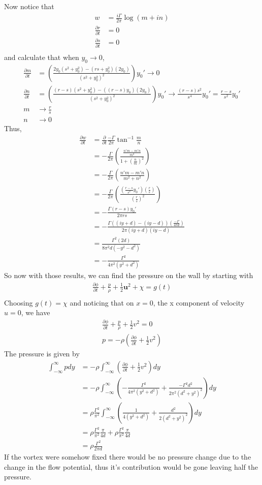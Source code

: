 \documentclass[12pt]{article}
\newcommand{\eq}[1]{\begin{align*}#1\end{align*}}
\newcommand{\p}[2]{\frac{\partial#1}{\partial#2}}
\begin{document}
Now notice that
\eq{
	w &= \frac{i\Gamma}{2\pi}\log(m + in)\\
	\p{r}{t} &= 0\\
	\p{s}{t} &= 0\\
}
and calculate that when $y_0 \rightarrow 0$,
\eq{
	\p{m}{t} &= \left(\frac{2y_0(s^2 + y_0^2) - (rs + y_0^2)(2y_0)}{(s^2 + y_0^2)^2}\right)y_0' \rightarrow 0\\
	\p{n}{t} &= \left( \frac{(r-s)(s^2 + y_0^2) - ((r-s)y_0)(2y_0)}{(s^2 + y_0^2)^2} \right)y_0' \rightarrow \frac{(r-s)s^2}{s^4}y_0' = \frac{r-s}{s^2}y_0'\\
	m &\rightarrow \frac{r}{s}\\
	n &\rightarrow 0
}
Thus,
\eq{
	\p{w}{t} &= \p{}{t}\frac{-\Gamma}{2\pi}\tan^{-1}\frac{m}{n}\\
	&= -\frac{\Gamma}{2\pi}\left( \frac{\frac{n'm - m'n}{m^2}}{1 + (\frac{n}{m})^2}\right)\\
	&= -\frac{\Gamma}{2\pi}\left( \frac{n'm - m'n}{m^2 + n^2}\right)\\
	&= -\frac{\Gamma}{2\pi}\left( \frac{\left(\frac{r-s}{s^2}y_0'\right)(\frac{r}{s})}{(\frac{r}{s})^2}\right)\\
	&= -\frac{\Gamma(r-s)y_0'}{2\pi rs}\\
	&= -\frac{\Gamma((iy + d) - (iy - d)) \left(\frac{-\Gamma}{4\pi d}\right) }{2\pi (iy + d)(iy - d)}\\
	&= \frac{\Gamma^2(2d)}{8\pi^2 d(-y^2 - d^2)}\\
	&= -\frac{\Gamma^2}{4\pi^2(y^2 + d^2)}
}
So now with those results, we can find the pressure on the wall by starting with
\eq{
	\p{\phi}{t} + \frac{p}{\rho} + \frac{1}{2}\bm{u}^2 + \chi = g(t)\\
}
Choosing $g(t) = \chi$ and noticing that on $x = 0$, the x component of velocity $u = 0$, we have
\eq{
	\p{\phi}{t} + \frac{p}{\rho} + \frac{1}{2}v^2 = 0\\
	p = -\rho\left(\p{\phi}{t} + \frac{1}{2}v^2\right)
}
The pressure is given by
\eq{
	\int_{-\infty}^\infty p dy &= -\rho\int_{-\infty}^\infty\left(\p{\phi}{t} + \frac{1}{2}v^2\right)dy\\
	&= -\rho\int_{-\infty}^\infty\left(-\frac{\Gamma^2}{4\pi^2(y^2 + d^2)} + \frac{-\Gamma^2 d^2}{2\pi^2(d^2 + y^2)^2}\right)dy\\
	&= \rho\frac{\Gamma^2}{\pi^2}\int_{-\infty}^\infty\left(\frac{1}{4(y^2 + d^2)} + \frac{d^2}{2(d^2 + y^2)^2}\right)dy\\
	&= \rho\frac{\Gamma^2}{\pi^2}\frac{\pi}{4d} + \rho\frac{\Gamma^2}{\pi^2}\frac{\pi}{4d}\\
	&= \rho\frac{\Gamma^2}{2\pi d}
}
If the vortex were somehow fixed there would be no pressure change due to the change in the flow potential, thus it's contribution would be gone leaving half the pressure.
\end{document}

